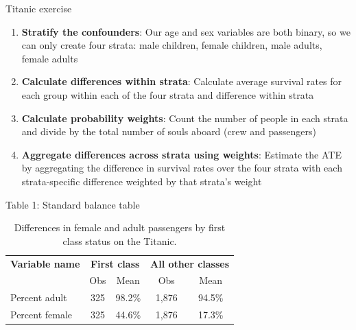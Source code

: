 \documentclass{beamer}
\begin{document}
\begin{frame}{Titanic exercise}

\begin{enumerate}
\item \textbf{Stratify the confounders}: Our age and sex variables are both binary, so we can only create four strata: male children, female children, male adults, female adults
\item \textbf{Calculate differences within strata}: Calculate average survival rates for each group within each of the four strata and difference within strata
\item \textbf{Calculate probability weights}: Count the number of people in each strata and divide by the total number of souls aboard (crew and passengers)
\item \textbf{Aggregate differences across strata using weights}: Estimate the ATE by aggregating the difference in survival rates over the four strata with each strata-specific difference weighted by that strata's weight
\end{enumerate}


\end{frame}

\begin{frame}{Table 1: Standard balance table}

{\renewcommand{\arraystretch}{1.1}
\tabcolsep 		
\begin{table}\small{}
\caption{Differences in female and adult passengers by first class status on the Titanic. }
\centering
\begin{tabular}{lcc|cc}
\toprule
\multicolumn{1}{c}{\textbf{Variable name}}&
\multicolumn{2}{c}{\textbf{First class}}&
\multicolumn{2}{c}{\textbf{All other classes}}\\
\multicolumn{1}{c}{}&
\multicolumn{1}{c}{Obs}&
\multicolumn{1}{c}{Mean}&
\multicolumn{1}{c}{Obs}&
\multicolumn{1}{c}{Mean}\\
\midrule
Percent adult		&	325 	& 98.2\% & 1,876 & 94.5\% \\
Percent female		& 	325	& 44.6\% & 1,876 & 17.3\% \\
\bottomrule
\end{tabular}
\label{tab:titanic-age}
\end{table}}
\end{frame}
\end{document}

